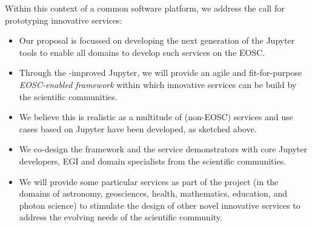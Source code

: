 Within this context of a common software platform, we address the call
for prototyping innovative services:
\begin{itemize}
\item Our \TheProject proposal is focussed on developing the next generation
of the Jupyter tools to enable all domains to develop such services on
the EOSC.

\item Through the \TheProject-improved Jupyter, we will provide an
  agile and fit-for-purpose \emph{EOSC-enabled
framework} within which innovative services can be build by the
scientific communities.

\item We believe this is realistic as a multitude of (non-EOSC) services and
  use cases based on Jupyter have been developed, as sketched above.

\item We co-design the framework and the service demonstrators with
  core Jupyter developers, EGI and domain specialists from the
  scientific communities.

\item We will provide some particular services as part of the project
  (in the domains of astronomy, geosciences, health, mathematics, education, and photon
  science) to stimulate the design of other novel innovative services
  to address the evolving needs of the scientific community.
\end{itemize}
\bigskip


